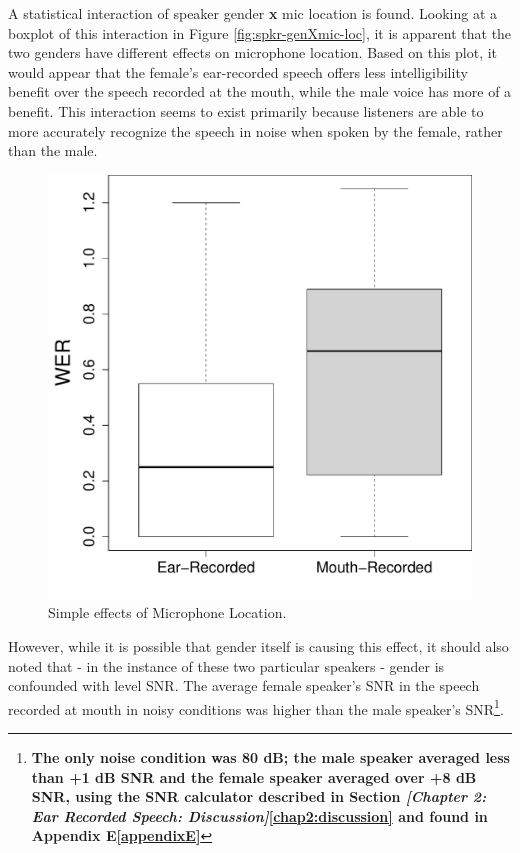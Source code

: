 \documentclass[dissertation,copyright]{uathesis}
\makeatletter
\def\maxwidth{ %
  \ifdim\Gin@nat@width>\linewidth
    \linewidth
  \else
    \Gin@nat@width
  \fi
}
\makeatother
\begin{document}
A statistical interaction of speaker gender \textbf{x} mic location is found.  
Looking at a boxplot of this interaction in Figure \ref{fig:spkr-genXmic-loc}, it is apparent that the two genders have different effects on microphone location.  Based on this plot, it would appear that the female's ear-recorded speech offers less intelligibility benefit over the speech recorded at the mouth, while the male voice has more of a benefit.  This interaction seems to exist primarily because listeners are able to more accurately recognize the speech in noise when spoken by the female, rather than the male.
%
\begin{figure}

\includegraphics[width=\maxwidth]{figure/Mic-location_simple-1} 

\caption{Simple effects of Microphone Location.}
\label{fig:mic_loc_simple}
\end{figure}
%
However, while it is possible that gender itself is causing this effect, it should also noted that - in the instance of these two particular speakers - gender is confounded with level SNR.  The average female speaker's SNR in the speech recorded at mouth in noisy conditions was higher than the male speaker's SNR\footnote{\textbf{The only noise condition was 80 dB; the male speaker averaged less than +1 dB SNR and the female speaker averaged over +8 dB SNR, using the SNR calculator described in Section \textit{[Chapter 2: Ear Recorded Speech: Discussion]}\ref{chap2:discussion} and found in Appendix E\ref{appendixE}}}.
\end{document}
